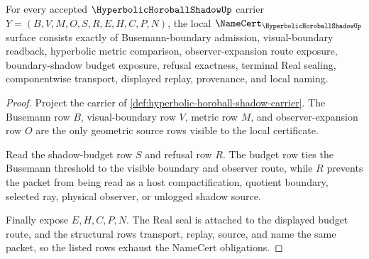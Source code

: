 \begin{theorem}
\label{thm:hyperbolic-horoball-shadow-namecert-obligations}
For every accepted $\HyperbolicHoroballShadowUp$ carrier $Y=(B,V,M,O,S,R,E,H,C,P,N)$, the local $\NameCert_{\HyperbolicHoroballShadowUp}$ surface consists exactly of Busemann-boundary admission, visual-boundary readback, hyperbolic metric comparison, observer-expansion route exposure, boundary-shadow budget exposure, refusal exactness, terminal Real sealing, componentwise transport, displayed replay, provenance, and local naming.
\end{theorem}
\begin{proof}
Project the carrier of \autoref{def:hyperbolic-horoball-shadow-carrier}. The Busemann row $B$, visual-boundary row $V$, metric row $M$, and observer-expansion row $O$ are the only geometric source rows visible to the local certificate.

Read the shadow-budget row $S$ and refusal row $R$. The budget row ties the Busemann threshold to the visible boundary and observer route, while $R$ prevents the packet from being read as a host compactification, quotient boundary, selected ray, physical observer, or unlogged shadow source.

Finally expose $E,H,C,P,N$. The Real seal is attached to the displayed budget route, and the structural rows transport, replay, source, and name the same packet, so the listed rows exhaust the NameCert obligations.
\end{proof}

